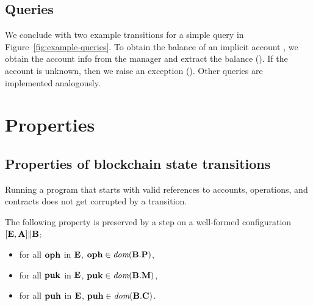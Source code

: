 \documentclass[a4paper]{llncs}
\begin{document}
\subsection{Queries}
\label{sec:queries}


We conclude with two example transitions for a simple query in
Figure~\ref{fig:example-queries}. To obtain the balance of an implicit
account \PUK, we obtain the account info from the manager and extract
the balance (). If the account is
unknown, then we raise an exception
(). Other queries are implemented analogously.

\section{Properties}
\label{sec:properties}

\subsection{Properties of blockchain state transitions}

Running a program that starts with valid references to accounts,
operations, and contracts does not get corrupted by a transition.
\begin{proposition}
  The following property is preserved by a step on a well-formed
  configuration $ [\textbf{E}, \textbf{A}] \| \textbf{B}$:
  \begin{itemize}
  \item for all $\textbf{oph}$ in $\textbf{E}$, $\textbf{oph} \in \textit{dom} (\textbf{B}.\textbf{P})$,
  \item for all $\textbf{puk}$ in $\textbf{E}$, $\textbf{puk} \in \textit{dom} (\textbf{B}.\textbf{M})$,
  \item for all $\textbf{puh}$ in $\textbf{E}$, $\textbf{puh} \in \textit{dom} (\textbf{B}.\textbf{C})$.
  \end{itemize}
\end{proposition}
\end{document}
